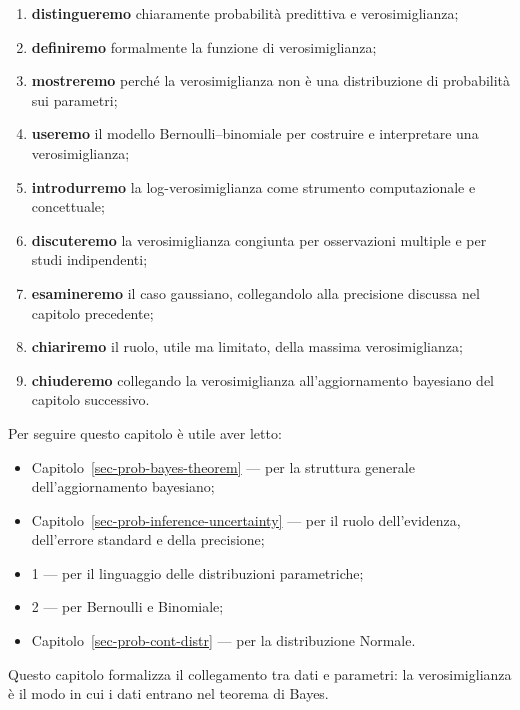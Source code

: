\documentclass[
  italian,
  letterpaper,
  a4paper,
  11pt,
  open=any]{scrbook}
\providecommand{\tightlist}{%
  \setlength{\itemsep}{0pt}\setlength{\parskip}{0pt}}
\theoremstyle{plain}
\theoremstyle{definition}
\theoremstyle{definition}
\theoremstyle{remark}
\begin{document}
\begin{enumerate}
\def\labelenumi{\arabic{enumi}.}
\tightlist
\item
  \textbf{distingueremo} chiaramente probabilità predittiva e
  verosimiglianza;
\item
  \textbf{definiremo} formalmente la funzione di verosimiglianza;
\item
  \textbf{mostreremo} perché la verosimiglianza non è una distribuzione
  di probabilità sui parametri;
\item
  \textbf{useremo} il modello Bernoulli--binomiale per costruire e
  interpretare una verosimiglianza;
\item
  \textbf{introdurremo} la log-verosimiglianza come strumento
  computazionale e concettuale;
\item
  \textbf{discuteremo} la verosimiglianza congiunta per osservazioni
  multiple e per studi indipendenti;
\item
  \textbf{esamineremo} il caso gaussiano, collegandolo alla precisione
  discussa nel capitolo precedente;
\item
  \textbf{chiariremo} il ruolo, utile ma limitato, della massima
  verosimiglianza;
\item
  \textbf{chiuderemo} collegando la verosimiglianza all'aggiornamento
  bayesiano del capitolo successivo.
\end{enumerate}

\begin{tcolorbox}[enhanced jigsaw, arc=.35mm, bottomrule=.15mm, bottomtitle=1mm, breakable, colback=white, colbacktitle=quarto-callout-tip-color!10!white, colframe=quarto-callout-tip-color-frame, coltitle=black, left=2mm, leftrule=.75mm, opacityback=0, opacitybacktitle=0.6, rightrule=.15mm, title=\textcolor{quarto-callout-tip-color}{\faLightbulb}\hspace{0.5em}{Prerequisiti}, titlerule=0mm, toprule=.15mm, toptitle=1mm]

Per seguire questo capitolo è utile aver letto:

\begin{itemize}
\tightlist
\item
  Capitolo~\ref{sec-prob-bayes-theorem} --- per la struttura generale
  dell'aggiornamento bayesiano;
\item
  Capitolo~\ref{sec-prob-inference-uncertainty} --- per il ruolo
  dell'evidenza, dell'errore standard e della precisione;
\item
  1 --- per il linguaggio delle distribuzioni parametriche;
\item
  2 --- per Bernoulli e Binomiale;
\item
  Capitolo~\ref{sec-prob-cont-distr} --- per la distribuzione Normale.
\end{itemize}

Questo capitolo formalizza il collegamento tra dati e parametri: la
verosimiglianza è il modo in cui i dati entrano nel teorema di Bayes.

\end{tcolorbox}
\end{document}
